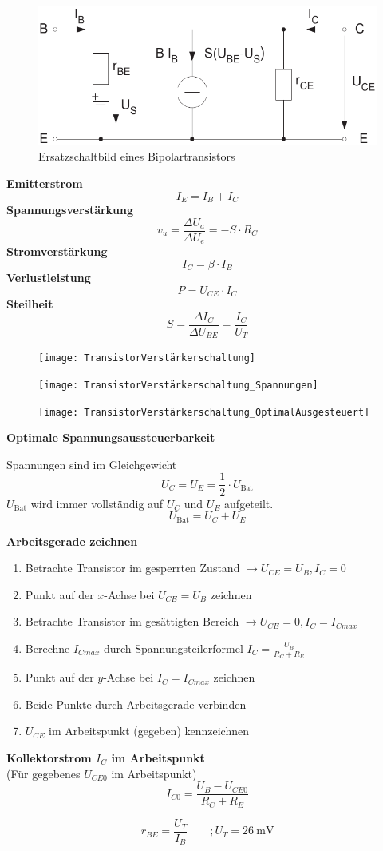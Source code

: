 \documentclass[a5paper, 12pt, twoside]{scrartcl}
\begin{document}
\begin{figure}[H]
  \centering
  \includegraphics[width=.6\textwidth]{ESBTransistor}
  \caption{Ersatzschaltbild eines Bipolartransistors}
\end{figure}

\textbf{Emitterstrom}
\[I_E = I_B + I_C\]
\textbf{Spannungsverstärkung}
\[v_u = \frac{\Delta U_a}{\Delta U_e} = -S \cdot R_C\]
\textbf{Stromverstärkung}
\[I_C = \beta \cdot I_B\]
\textbf{Verlustleistung}
\[P = U_{CE} \cdot I_C\]
\textbf{Steilheit}
\[S = \frac{\Delta I_C}{\Delta U_{BE}} = \frac{I_C}{U_T}\]

\begin{figure}[H]
  \centering
  \texttt{[image: TransistorVerstärkerschaltung]}
\end{figure}

\begin{figure}[H]
  \centering
  \texttt{[image: TransistorVerstärkerschaltung\_Spannungen]}
\end{figure}

\begin{figure}[H]
  \centering
  \texttt{[image: TransistorVerstärkerschaltung\_OptimalAusgesteuert]}
\end{figure}

\textbf{Optimale Spannungsaussteuerbarkeit}

Spannungen sind im Gleichgewicht
\[U_C = U_E = \frac{1}{2} \cdot U_{\text{Bat}}\]
\(U_{\text{Bat}}\) wird immer vollständig auf \(U_C\) und \(U_E\) aufgeteilt.
\[U_{\text{Bat}} = U_C + U_E\]

\textbf{Arbeitsgerade zeichnen}

\begin{enumerate}
\item Betrachte Transistor im gesperrten Zustand \(\rightarrow U_{CE} = U_B, I_C = 0\)
\item Punkt auf der \(x\)-Achse bei \(U_{CE} = U_B\) zeichnen
\item Betrachte Transistor im gesättigten Bereich \(\rightarrow U_{CE} = 0, I_C = I_{Cmax}\)
\item Berechne \(I_{Cmax}\) durch Spannungsteilerformel \(I_C = \frac{U_B}{R_C + R_E}\)
\item Punkt auf der \(y\)-Achse bei \(I_C = I_{Cmax}\) zeichnen
\item Beide Punkte durch Arbeitsgerade verbinden
\item \(U_{CE}\) im Arbeitspunkt (gegeben) kennzeichnen
\end{enumerate}

\textbf{Kollektorstrom \(I_C\) im Arbeitspunkt}\\
(Für gegebenes \(U_{CE0}\) im Arbeitspunkt)
\[I_{C0} = \frac{U_B - U_{CE0}}{R_C + R_E}\]

\[r_{BE} = \frac{U_T}{I_B} \qquad; U_T = \SI{26}{\milli\volt}\]
\end{document}
